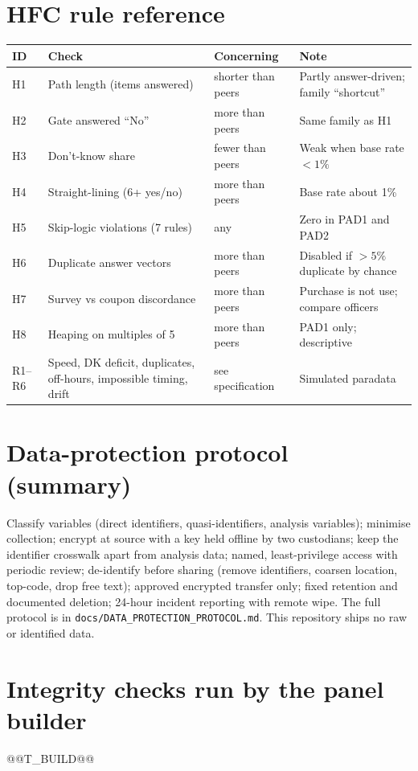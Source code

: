 \documentclass[11pt,a4paper]{article}
\begin{document}
\section{HFC rule reference}\label{app:hfc}
\small\setlength{\tabcolsep}{4pt}
\begin{tabular}{p{1.1cm}p{4.0cm}p{2.7cm}p{6cm}}\toprule ID & Check & Concerning & Note\\\midrule
H1 & Path length (items answered) & shorter than peers & Partly answer-driven; family ``shortcut''\\
H2 & Gate answered ``No'' & more than peers & Same family as H1\\
H3 & Don't-know share & fewer than peers & Weak when base rate $<1\%$\\
H4 & Straight-lining (6+ yes/no) & more than peers & Base rate about 1\%\\
H5 & Skip-logic violations (7 rules) & any & Zero in PAD1 and PAD2\\
H6 & Duplicate answer vectors & more than peers & Disabled if $>5\%$ duplicate by chance\\
H7 & Survey vs coupon discordance & more than peers & Purchase is not use; compare officers\\
H8 & Heaping on multiples of 5 & more than peers & PAD1 only; descriptive\\
R1--R6 & Speed, DK deficit, duplicates, off-hours, impossible timing, drift & see specification & Simulated paradata\\\bottomrule\end{tabular}
\normalsize

\section{Data-protection protocol (summary)}\label{app:dp}
Classify variables (direct identifiers, quasi-identifiers, analysis variables); minimise collection; encrypt at source with a key held offline by two custodians; keep the identifier crosswalk apart from analysis data; named, least-privilege access with periodic review; de-identify before sharing (remove identifiers, coarsen location, top-code, drop free text); approved encrypted transfer only; fixed retention and documented deletion; 24-hour incident reporting with remote wipe. The full protocol is in \texttt{docs/DATA\_PROTECTION\_PROTOCOL.md}. This repository ships no raw or identified data.

\section{Integrity checks run by the panel builder}
\small\setlength{\tabcolsep}{6pt}\begin{center}@@T_BUILD@@\end{center}\normalsize
\end{document}

